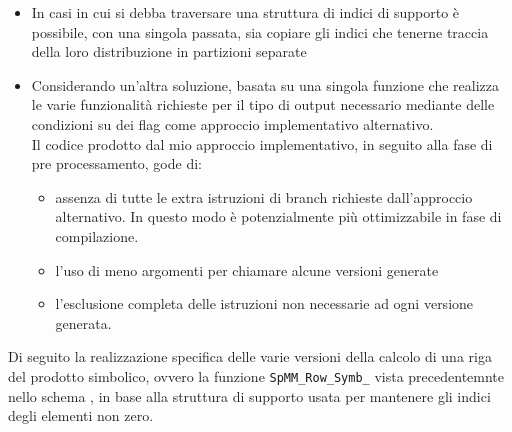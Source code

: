 \begin{itemize}
	\item In casi in cui si debba traversare una struttura di indici di supporto
		  è possibile,  con una singola passata, 
		  sia copiare gli indici che tenerne traccia della loro distribuzione in partizioni separate 

	\item Considerando un'altra soluzione, basata su una singola funzione che realizza le varie  %
		  funzionalità richieste per il tipo di output necessario mediante delle condizioni su dei flag come approccio implementativo alternativo.\\
		  Il codice prodotto dal mio approccio implementativo, in seguito alla fase di pre processamento, gode di:
	\begin{itemize}
		\item assenza di tutte le extra istruzioni di branch richieste dall'approccio alternativo. 
			  In questo modo è potenzialmente più ottimizzabile in fase di compilazione.
		\item l'uso di meno argomenti per chiamare alcune versioni generate 
		\item l'esclusione completa delle istruzioni non necessarie ad ogni versione generata.
	\end{itemize}
\end{itemize}
\label{chSpMMSymb:SpMM_Row_Symb_targetBaseFunc}
Di seguito la realizzazione specifica delle varie versioni della calcolo di una riga del prodotto simbolico,
ovvero la funzione \verb|SpMM_Row_Symb_| vista precedentemnte nello schema ,
in base alla struttura di supporto usata per mantenere gli indici degli elementi non zero. 
